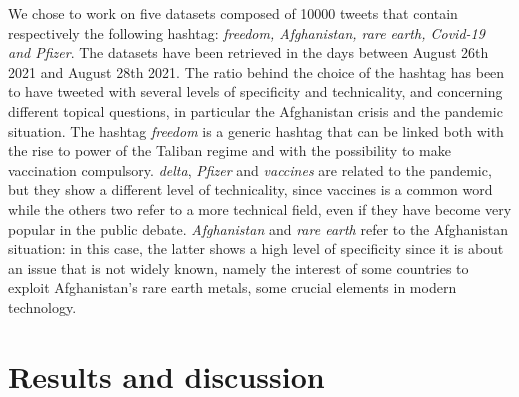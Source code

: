 \documentclass[12pt,%
               a4paper,%
               oneside,openany,%
               titlepage,%
               headinclude,footinclude,%
               BCOR5mm,%
               cleardoublepage=empty,%
               tablecaptionabove,%
               floatperchapter,
               ]{scrreprt}                 %
\begin{document}
We chose to work on five datasets composed of 10000 tweets that contain respectively the following hashtag: \textit{freedom, Afghanistan, rare earth, Covid-19 and Pfizer}. The datasets have been retrieved in the days between August 26th 2021 and August 28th 2021. The ratio behind the choice of the hashtag has been to have tweeted with several levels of specificity and technicality, and concerning different topical questions, in particular the Afghanistan crisis and the pandemic situation. The hashtag \textit{freedom} is a generic hashtag that can be linked both with the rise to power of the Taliban regime and with the possibility to make vaccination compulsory.  \textit{delta}, \textit{Pfizer} and \textit{vaccines} are related to the pandemic,  but they show a different level of technicality, since vaccines is a common word while the others two refer to a more technical field, even if they have become very popular in the public debate.  \textit{Afghanistan} and \textit{rare earth } refer to the Afghanistan situation: in this case, the latter shows a high level of specificity since it is about an issue that is not widely known, namely the interest of some countries to exploit Afghanistan’s rare earth metals, some crucial elements in modern technology.


\chapter{Results and discussion}
\end{document}
